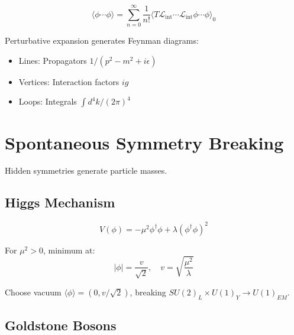\begin{equation}
\langle\phi\cdots\phi\rangle = \sum_{n=0}^\infty \frac{1}{n!}\langle T\mathcal{L}_{\text{int}}\cdots\mathcal{L}_{\text{int}}\phi\cdots\phi\rangle_0
\end{equation}

\begin{proposition}
\label{prop:feynman}
Perturbative expansion generates Feynman diagrams:
\begin{itemize}
\item Lines: Propagators $1/(p^2 - m^2 + i\epsilon)$
\item Vertices: Interaction factors $ig$
\item Loops: Integrals $\int d^4k/(2\pi)^4$
\end{itemize}
\end{proposition}

\section{Spontaneous Symmetry Breaking}

Hidden symmetries generate particle masses.

\subsection{Higgs Mechanism}

\begin{definition}
\label{def:higgs-pot}
\begin{equation}
V(\phi) = -\mu^2\phi^\dagger\phi + \lambda(\phi^\dagger\phi)^2
\end{equation}
\end{definition}

\begin{theorem}
\label{thm:ssb}
For $\mu^2 > 0$, minimum at:
\begin{equation}
|\phi| = \frac{v}{\sqrt{2}}, \quad v = \sqrt{\frac{\mu^2}{\lambda}}
\end{equation}

Choose vacuum $\langle\phi\rangle = (0, v/\sqrt{2})$, breaking $SU(2)_L \times U(1)_Y \to U(1)_{EM}$.
\end{theorem}

\subsection{Goldstone Bosons}

